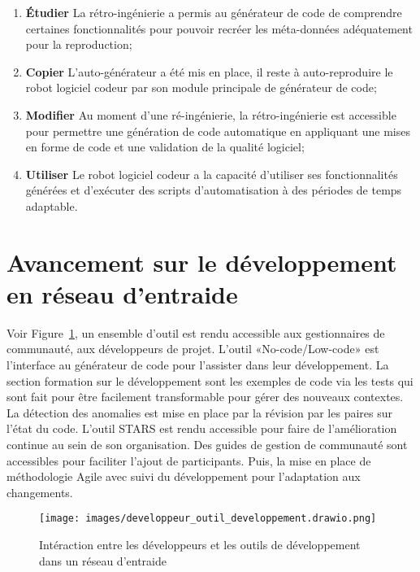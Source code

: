 \begin{enumerate}
    \item \textbf{Étudier} La rétro-ingénierie a permis au générateur de code de comprendre certaines fonctionnalités pour pouvoir recréer les méta-données adéquatement pour la reproduction;
    \item \textbf{Copier} L’auto-générateur a été mis en place, il reste à auto-reproduire le robot logiciel codeur par son module principale de générateur de code;
    \item \textbf{Modifier} Au moment d'une ré-ingénierie, la rétro-ingénierie est accessible pour permettre une génération de code automatique en appliquant une mises en forme de code et une validation de la qualité logiciel;
    \item \textbf{Utiliser} Le robot logiciel codeur a la capacité d’utiliser ses fonctionnalités générées et d’exécuter des scripts d’automatisation à des périodes de temps adaptable.
\end{enumerate}

\section{Avancement sur le développement en réseau d'entraide}

Voir Figure~\ref{fig:dia_outil_dev_reseau_entraide}, un ensemble d'outil est rendu accessible aux gestionnaires de communauté, aux développeurs de projet. L'outil «No-code/Low-code» est l'interface au générateur de code pour l'assister dans leur développement. La section formation sur le développement sont les exemples de code via les tests qui sont fait pour être facilement transformable pour gérer des nouveaux contextes. La détection des anomalies est mise en place par la révision par les paires sur l'état du code. L'outil STARS est rendu accessible pour faire de l'amélioration continue au sein de son organisation. Des guides de gestion de communauté sont accessibles pour faciliter l'ajout de participants. Puis, la mise en place de méthodologie Agile avec suivi du développement pour l'adaptation aux changements.

\begin{figure}
\centering
\texttt{[image: images/developpeur\_outil\_developpement.drawio.png]}
\caption{Intéraction entre les développeurs et les outils de développement dans un réseau d'entraide}
\label{fig:dia_outil_dev_reseau_entraide}
\end{figure}


